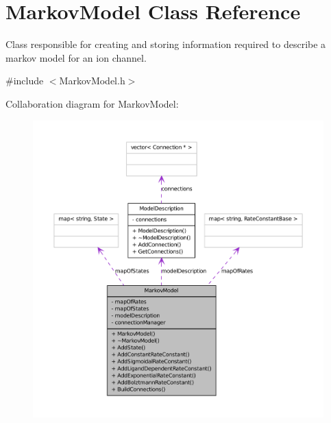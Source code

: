 \hypertarget{classMarkovModel}{
\section{MarkovModel Class Reference}
\label{classMarkovModel}
}


Class responsible for creating and storing information required to describe a markov model for an ion channel.  




{\ttfamily \#include $<$MarkovModel.h$>$}



Collaboration diagram for MarkovModel:\nopagebreak
\begin{figure}[H]
\begin{center}
\leavevmode
\includegraphics[width=400pt]{classMarkovModel__coll__graph}
\end{center}
\end{figure}
